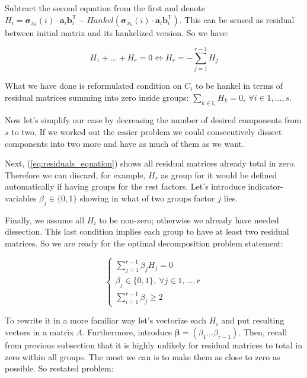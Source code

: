 	Subtract the second equation from the first and denote $ H_i = \boldsymbol{\sigma}_{x_k}(i) \cdot \mathbf{a}_i  \mathbf{b}_i^{\mathsf{T}} - Hankel(\boldsymbol{\sigma}_{x_k}(i) \cdot \mathbf{a}_i  \mathbf{b}_i^{\mathsf{T}}) $. This can be sensed as residual between initial matrix and its hankelized version. So we have:
	
	\begin{equation}\label{eq:residuals_equation}
		H_1 + \ldots + H_r = 0 \Leftrightarrow H_r = - \sum\limits_{j = 1}^{r - 1} H_j
	\end{equation}
	
	What we have done is reformulated condition on $ C_i $ to be hankel in terms of residual matrices summing into zero inside groups: $ \sum_{k \in \mathbb{I}_i} H_k = 0, \  \forall i \in 1, \ldots, s $.
	
	Now let's simplify our case by decreasing the number of desired components from $ s $ to two. If we worked out the easier problem we could consecutively dissect components into two more and have as much of them as we want.  
	
	Next, (\ref{eq:residuals_equation}) shows all residual matrices already total in zero. Therefore we can discard, for example, $ H_r $ as group for it would be defined automatically if having groups for the rest factors. Let's introduce indicator-variables $ \beta_j \in \{0, 1\} $ showing in what of two groups factor $ j $ lies.
	
	Finally, we assume all $ H_i $ to be non-zero; otherwise we already have needed dissection. This last condition implies each group to have at least two residual matrices. So we are ready for the optimal decomposition problem statement:
	
	\begin{equation}
		\begin{cases*}
			\sum\limits_{j = 1}^{r - 1} \beta_j H_j = 0 \\
			\beta_j \in \{0, 1\}, \ \forall j \in 1, \ldots, r \\
			\sum\limits_{i = 1}^{r - 1} \beta_j \ge 2
		\end{cases*}
	\end{equation}
	
	To rewrite it in a more familiar way let's vectorize each $ H_i $ and put resulting vectors in a matrix $ \Lambda $. Furthermore, introduce $ \boldsymbol{\beta} = (\beta_1 \ldots \beta_{r-1}) $. Then, recall from previous subsection that it is highly unlikely for residual matrices to total in zero within all groups. The most we can is to make them as close to zero as possible. So restated problem:
	
